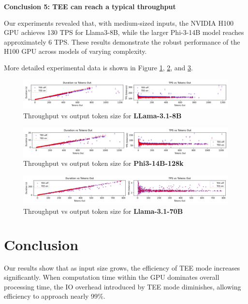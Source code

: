 \documentclass{article}
\begin{document}
\noindent\textbf{Conclusion 5: TEE can reach a typical throughput}

Our experiments revealed that, with medium-sized inputs, the NVIDIA H100 GPU achieves 130 TPS for Llama3-8B, while the larger Phi-3-14B model reaches approximately 6 TPS. These results demonstrate the robust performance of the H100 GPU across models of varying complexity.

More detailed experimental data is shown in Figure \ref{fig:scatter-llama8b}, \ref{fig:scatter-phi14b}, and \ref{fig:scatter-llama70b}.


\begin{figure}[ht]
    \centering
    \includegraphics[width=1\linewidth]{scatter-llama8b.png}
    \caption{Throughput vs output token size for \textbf{LLama-3.1-8B}}
    \label{fig:scatter-llama8b}
\end{figure}

\begin{figure}[ht]
    \centering
    \includegraphics[width=1\linewidth]{scatter-phi14b.png}
    \caption{Throughput vs output token size for \textbf{Phi3-14B-128k}}
    \label{fig:scatter-phi14b}
\end{figure}

\begin{figure}[ht]
    \centering
    \includegraphics[width=1\linewidth]{scatter-llama70b.png}
    \caption{Throughput vs output token size for \textbf{Llama-3.1-70B}}
    \label{fig:scatter-llama70b}
\end{figure}

\section{Conclusion}

Our results show that as input size grows, the efficiency of TEE mode increases significantly. When computation time within the GPU dominates overall processing time, the IO overhead introduced by TEE mode diminishes, allowing efficiency to approach nearly 99\%.
\end{document}
